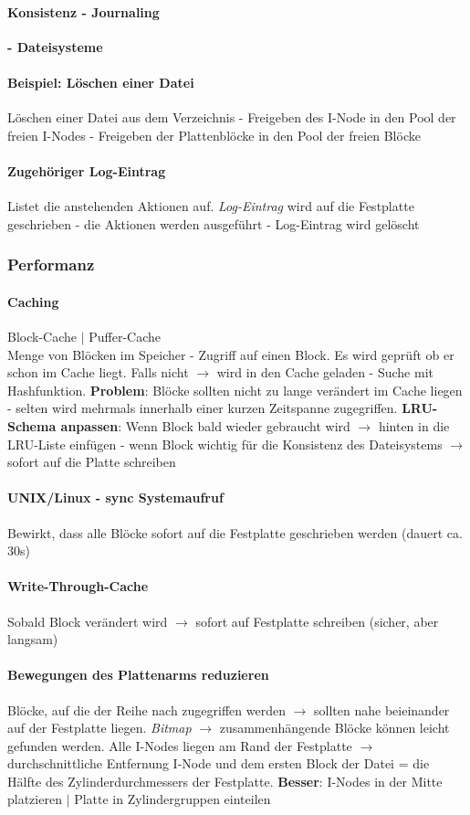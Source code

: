 \documentclass[11pt,a4paper,landscape]{article}
\begin{document}
\begin{multicols*}{3}
	\paragraph{Konsistenz - Journaling} \textbf{- Dateisysteme}
	\paragraph{Beispiel: Löschen einer Datei} Löschen einer Datei aus dem Verzeichnis - Freigeben des I-Node in den Pool der freien I-Nodes - Freigeben der Plattenblöcke in den Pool der freien Blöcke
	\paragraph{Zugehöriger Log-Eintrag} Listet die anstehenden Aktionen auf. \textit{Log-Eintrag} wird auf die Festplatte geschrieben - die Aktionen werden ausgeführt - Log-Eintrag wird gelöscht
	\subsubsection{Performanz}
	\paragraph{Caching} Block-Cache $\vert$ Puffer-Cache\\
	Menge von Blöcken im Speicher - Zugriff auf einen Block. Es wird geprüft ob er schon im Cache liegt. Falls nicht $\rightarrow$ wird in den Cache geladen - Suche mit Hashfunktion. \textbf{Problem}: Blöcke sollten nicht zu lange verändert im Cache liegen - selten wird mehrmals innerhalb einer kurzen Zeitspanne zugegriffen. \textbf{LRU-Schema anpassen}: Wenn Block bald wieder gebraucht wird $\rightarrow$ hinten in die LRU-Liste einfügen - wenn Block wichtig für die Konsistenz des Dateisystems $\rightarrow$ sofort auf die Platte schreiben
	\paragraph{UNIX/Linux - sync Systemaufruf} Bewirkt, dass alle Blöcke sofort auf die Festplatte geschrieben werden (dauert ca. 30s)
	\paragraph{Write-Through-Cache} Sobald Block verändert wird $\rightarrow$ sofort auf Festplatte schreiben (sicher, aber langsam)
	\paragraph{Bewegungen des Plattenarms reduzieren} Blöcke, auf die der Reihe nach zugegriffen werden $\rightarrow$ sollten nahe beieinander auf der Festplatte liegen. \textit{Bitmap} $\rightarrow$ zusammenhängende Blöcke können leicht gefunden werden. Alle I-Nodes liegen am Rand der Festplatte $\rightarrow$ durchschnittliche Entfernung I-Node und dem ersten Block der Datei = die Hälfte des Zylinderdurchmessers der Festplatte. \textbf{Besser}: I-Nodes in der Mitte platzieren $\vert$ Platte in Zylindergruppen einteilen

\end{multicols*}
\end{document}
